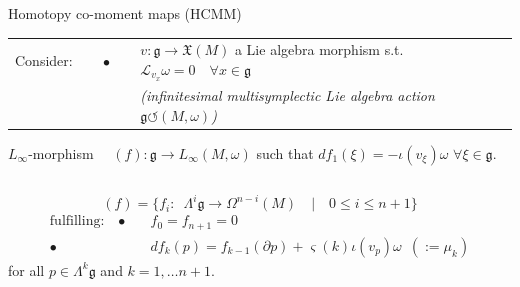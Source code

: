 \documentclass[beamer,handout,10pt]{standalone}
\begin{document}
\begin{frame}[shrink]{Homotopy co-moment maps (HCMM)}	

		\begin{tabular}{lll}
			\quad Consider: 
			&$\quad\bullet\quad$
			& $v:\mathfrak g\to \mathfrak X(M)$  a Lie algebra morphism 
			s.t. $\mathcal{L}_{v_x}\omega=0 \quad  \forall x\in\mathfrak g$\\
			& & \emph{(infinitesimal multisymplectic Lie algebra action $\mathfrak{g}\circlearrowleft (M,\omega)$)}
		\end{tabular} 
		\vspace{.5em}
		\begin{defblock}
			\vspace{.25em}
			\centering
			\parbox{0.96\linewidth}{%
  				$L_\infty$-morphism $\quad(f): \mathfrak{g} \to L_\infty(M,\omega)$
  				 \quad such that \quad
  				 $d f_1 (\xi) = -\iota(v_\xi) \omega $ $\forall \xi \in \mathfrak{g}$.
  		}
		\end{defblock}
		\begin{columns}
			\begin{column}{.625\textwidth}			
				\begin{propblock}[HCMM unfolded]
					\begin{displaymath}
						(f)  = \big\{ f_i: \,\,\, \Lambda^i {\mathfrak g} \to \Omega^{n-i}(M)
						\quad \vert \quad 
						0\leq i \leq n+1  \big\}	
					\end{displaymath}
					\begin{displaymath}
						\begin{split}
							\text{fulfilling:}\quad
							\bullet\quad & f_0 = f_{n+1} = 0
							\\
							\bullet\quad & d f_k (p) = f_{k-1} (\partial p)  
							+ \varsigma(k) \iota(v_p) \omega
							\; ~( := \mu_k )
						\end{split}
					\end{displaymath}	
					for all $p \in \Lambda^k\mathfrak{g}$ and $k=1,\dots n+1$.	
				\end{propblock}
			\end{column}

\end{columns}
\end{frame}
\end{document}
